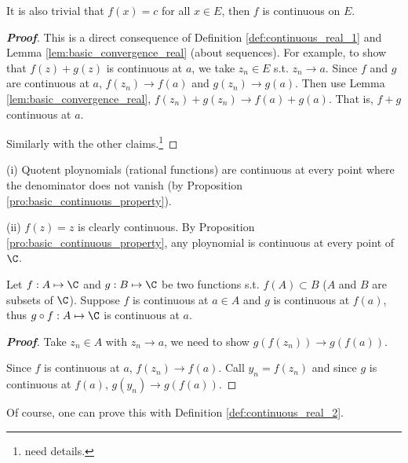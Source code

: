 \begin{remark}
It is also trivial that $f(x) = c$ for all $x\in E$, then $f$ is continuous on $E$.
\end{remark}

\begin{proof}[{\bf Proof}]
This is a direct consequence of Definition \ref{def:continuous_real_1} and Lemma \ref{lem:basic_convergence_real} (about sequences). For example, to show that $f(z)+g(z)$ is continuous at $a$, we take $z_n\in E$ s.t. $z_n\to a$. Since $f$ and $g$ are continuous at $a$, $f(z_n)\to f(a)$ and $g(z_n)\to g(a)$. Then use Lemma \ref{lem:basic_convergence_real}, $f(z_n)+g(z_n)\to f(a) + g(a)$. That is, $f+g$ continuous at $a$.

Similarly with the other claims.\footnote{need details.}
\end{proof}

\begin{example}
\ben
\item [(i)] Quotent ploynomials (rational functions) are continuous at every point where the denominator does not vanish (by Proposition \ref{pro:basic_continuous_property}).
\item [(ii)] $f(z)=z$ is clearly continuous. By Proposition \ref{pro:basic_continuous_property}, any ploynomial is continuous at every point of $\C$.
\een
\end{example}

\begin{theorem}\label{thm:composition_of_continuous_functions}
Let $f:A\mapsto \C$ and $g:B\mapsto \C$ be two functions s.t. $f(A)\subset B$ ($A$ and $B$ are subsets of $\C$). Suppose $f$ is continuous at $a\in A$ and $g$ is continuous at $f(a)$, thus $g\circ f:A\mapsto \C$ is continuous at $a$.
\end{theorem}

\begin{proof}[{\bf Proof}]
Take $z_n\in A$ with $z_n\to a$, we need to show $g(f(z_n))\to g(f(a))$.

Since $f$ is continuous at $a$, $f(z_n)\to f(a)$. Call $y_n=f(z_n)$ and since $g$ is continuous at $f(a)$, $g(y_n)\to g(f(a))$.
\end{proof}


\begin{remark}
Of course, one can prove this with Definition \ref{def:continuous_real_2}.
\end{remark}

